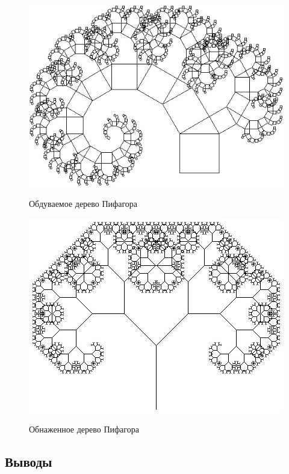 \documentclass[a4paper,12pt]{article}
\begin{document}
	\begin{figure}[h!]
		\begin{center}
			{\includegraphics[scale = 0.5]{Wind.jpg}}
			\caption{Обдуваемое дерево Пифагора}
			\label{ris:2}
		\end{center}
	\end{figure}
	
	\begin{figure}[h!]
		\begin{center}
			{\includegraphics[scale = 0.5]{Neeked.jpg}}
			\caption{Обнаженное дерево Пифагора}
			\label{ris:3}
		\end{center}
	\end{figure}

	\newpage
	
	\subsection{Выводы}
	
\end{document}
